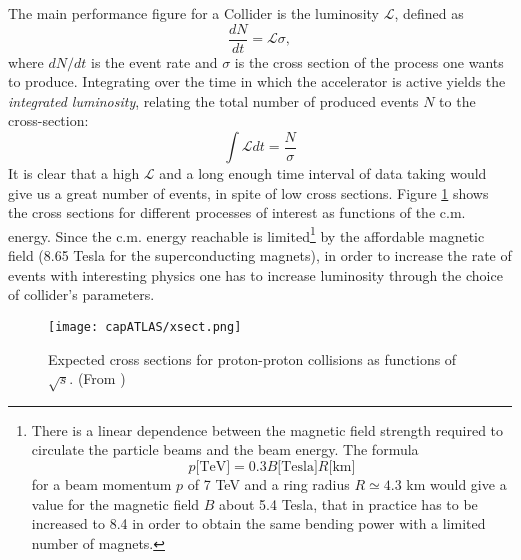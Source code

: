 The main performance figure for a Collider is the luminosity $\mathcal L$, defined as 
\begin{equation}\label{eq:lumiN}
\dfrac{dN}{dt} = \mathcal L \sigma ,
\end{equation} 
where $dN/dt $ is the event rate and  $ \sigma$ is the cross section of the process one wants to produce.
Integrating over the time in which the accelerator is active yields
the \textit{integrated luminosity}, relating the total number of produced
events $N$ to the cross-section:
\begin{equation}\label{eq:intLumi}
\int \mathcal L dt  = \dfrac{N}{\sigma} 
\end{equation}
It is clear that a high $\mathcal L$ and a long enough time interval of data taking would give us a great number of events, in spite of low cross sections. Figure \ref{xsec} shows the cross sections for different processes of interest as functions of the c.m. energy. Since the c.m. energy reachable is limited\footnote{There is a linear dependence between the magnetic field strength required to circulate the particle beams and the beam energy. The formula $$p\mbox{[TeV]} = 0.3B\mbox{[Tesla]}R\mbox{[km]}$$ for a beam momentum $p$ of 7 TeV and a ring radius $R \simeq 4.3$ km would give a value for the magnetic field $B$ about 5.4 Tesla, that in practice has to be increased to 8.4 in order to obtain the same bending power with a limited number of magnets.} by the affordable magnetic field (8.65 Tesla for the superconducting magnets), in order to increase the rate of events with interesting physics one has to increase luminosity through the choice of collider's parameters.

\begin{figure}[htb]\begin{center}
\texttt{[image: capATLAS/xsect.png]}\caption{Expected cross sections for proton-proton collisions as functions of $\sqrt{s}$. (From \cite{hep})}\label{xsec}\end{center}\end{figure} 

